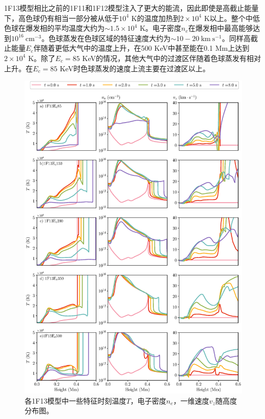 1F13模型相比之前的1F11和1F12模型注入了更大的能流，因此即使是高截止能量下，高色球仍有相当一部分被从低于$10^4$ K的温度加热到$2\times10^4$ K以上。整个中低色球在爆发相的平均温度大约为$\sim 1.5\times 10^4$ K。电子密度$n_e$在爆发相中最高能够达到$10^{16}\ \mathrm{cm^{-3}}$。色球蒸发在色球区域的特征速度大约为$\sim 10-20\ \mathrm{km \  s^{-1}}$。同样高截止能量$E_c$伴随着更低大气中的温度上升，在500 KeV中甚至能在0.1 Mm上达到$2\times 10^4$ K。除了$E_c = 85$ KeV的情况，其他大气中的过渡区伴随着色球蒸发有相对上升。在$E_c = 85$ KeV时色球蒸发的速度上流主要在过渡区以上。

\begin{figure}
	\centering
	\includegraphics[width=\textwidth]{figs/dMe_atoms_3}
	\caption{各1F13模型中一些特征时刻温度$T$，电子密度$n_e$，一维速度$v_z$随高度分布图。}
	\label{fig:4.3}
\end{figure}

